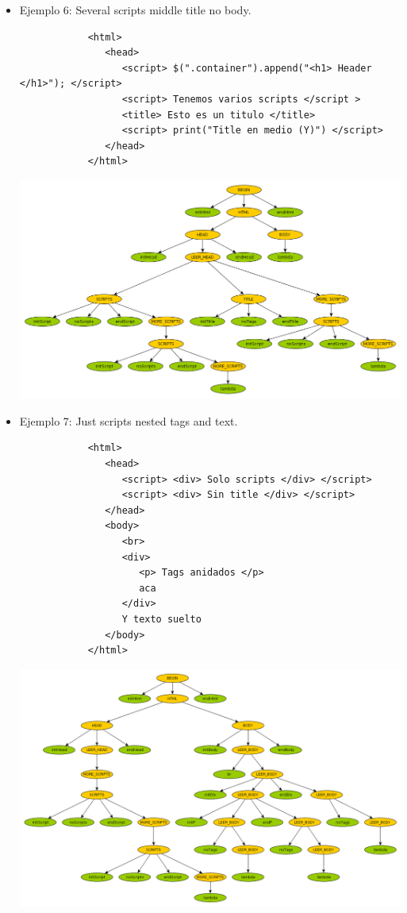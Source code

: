 \begin{itemize}
\newpage

	\item{  Ejemplo 6: Several scripts middle title no body.
		\begin{verbatim}
			<html>
			   <head> 
			      <script> $(".container").append("<h1> Header </h1>"); </script> 
			      <script> Tenemos varios scripts </script > 
			      <title> Esto es un titulo </title>
			      <script> print("Title en medio (Y)") </script> 
			   </head> 
			</html> 
		\end{verbatim}

	}

\begin{center}
	\includegraphics[scale=0.40]{Imagenes/6_several_scripts_middle_title_no_body.png}\\
\end{center}

\newpage

	\item{  Ejemplo 7: Just scripts nested tags and text.
		\begin{verbatim}
			<html>
			   <head> 
			      <script> <div> Solo scripts </div> </script> 
			      <script> <div> Sin title </div> </script>
			   </head>
			   <body> 
			      <br> 
			      <div>
			         <p> Tags anidados </p> 
			         aca 
			      </div> 
			      Y texto suelto
			   </body>
			</html>
		\end{verbatim}

	}

\begin{center}
	\includegraphics[scale=0.37]{Imagenes/7_just_scripts_nested_tags_and_text.png}\\
\end{center}

  \end{itemize}
